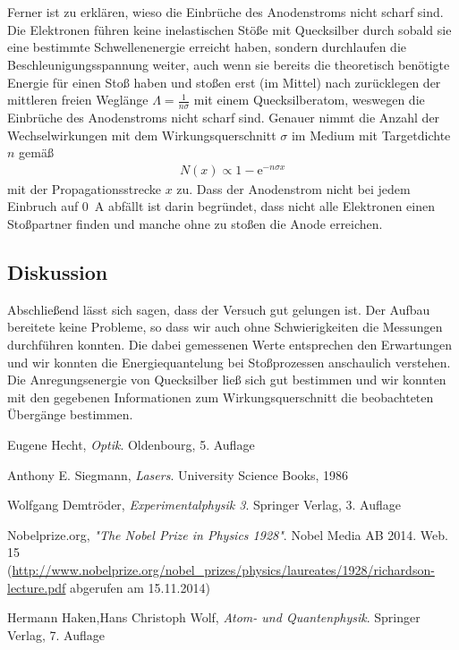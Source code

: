 \documentclass[11pt, a4paper]{article}
\begin{document}
\\
\\
Ferner ist zu erklären, wieso die Einbrüche des Anodenstroms nicht scharf sind.
Die Elektronen führen keine inelastischen Stöße mit Quecksilber durch sobald sie eine bestimmte Schwellenenergie erreicht haben, sondern durchlaufen die Beschleunigungsspannung weiter, auch wenn sie bereits die theoretisch benötigte Energie für einen Stoß haben und stoßen erst (im Mittel) nach zurücklegen der mittleren freien Weglänge $\Lambda = \frac{1}{n \sigma}$ mit einem Quecksilberatom, weswegen die Einbrüche des Anodenstroms nicht scharf sind.
Genauer nimmt die Anzahl der Wechselwirkungen mit dem Wirkungsquerschnitt $\sigma$ im Medium mit Targetdichte $n$ gemäß
\begin{align*}
N(x) \propto 1-\mathrm{e}^{-n \sigma x}
\end{align*}
mit der Propagationsstrecke $x$ zu.
Dass der Anodenstrom nicht bei jedem Einbruch auf \SI{0}{\ampere} abfällt ist darin begründet, dass nicht alle Elektronen einen Stoßpartner finden und manche ohne zu stoßen die Anode erreichen.
\subsection{Diskussion}

Abschließend lässt sich sagen, dass der Versuch gut gelungen ist.
Der Aufbau bereitete keine Probleme, so dass wir auch ohne Schwierigkeiten die Messungen durchführen konnten.
Die dabei gemessenen Werte entsprechen den Erwartungen und wir konnten die Energiequantelung bei Stoßprozessen anschaulich verstehen.
Die Anregungsenergie von Quecksilber ließ sich gut bestimmen und wir konnten mit den gegebenen Informationen zum Wirkungsquerschnitt die beobachteten Übergänge bestimmen.

\FloatBarrier


\begin{thebibliography}{9}

	Eugene Hecht,
	\emph{Optik}.
	Oldenbourg,
	5. Auflage
	
	Anthony E. Siegmann,
	\emph{Lasers}.
	University Science Books,
	1986
	
	Wolfgang Demtröder,
	\emph{Experimentalphysik 3}.
	Springer Verlag,
	3. Auflage

 Nobelprize.org,
 \emph{"The Nobel Prize in Physics 1928"}.
 Nobel Media AB 2014. Web. 15\\
 (\url{http://www.nobelprize.org/nobel_prizes/physics/laureates/1928/richardson-lecture.pdf} abgerufen am 15.11.2014)
 
	Hermann Haken,Hans Christoph Wolf,
	\emph{Atom- und Quantenphysik}.
	Springer Verlag,
	7. Auflage
 
\end{thebibliography}
\end{document}
